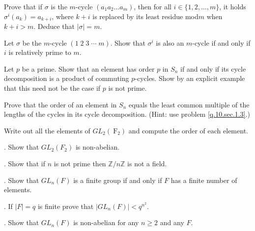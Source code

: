 \documentclass[
    11pt,a4paper,
]{exam}
\begin{document}
\begin{questions}
    \question\label{q.10.sec.1.3}
    Prove that if \(\sigma\) is the \(m\)-cycle \(\left(a_1 a_2 \ldots a_m\right)\), then for all \(i \in\{1,2, \ldots, m\}\), it holds \(\sigma^i\left(a_k\right)=a_{k+i}\), where \(k+i\) is replaced by its least residue mod\;\(m\) when \(k+i>m\). Deduce that \(|\sigma|=m\).
    
    \question
    Let \(\sigma\) be the \(m\)-cycle \((1\; 2\; 3\; \cdots\; m)\). Show that \(\sigma^i\) is also an \(m\)-cycle if and only if \(i\) is relatively prime to \(m\).
    
    
    \question
    Let \(p\) be a prime. Show that an element has order \(p\) in \(S_n\) if and only if its cycle decomposition is a product of commuting \(p\)-cycles. Show by an explicit example that this need not be the case if \(p\) is not prime.
    
    \question
    Prove that the order of an element in \(S_n\) equals the least common multiple of the lengths of the cycles in its cycle decomposition. (Hint: use problem \ref{q.10.sec.1.3}.)
    
    
    \question
    
    
    
    
    \question
    Write out all the elements of \(G L_2\left(\mathrm{~F}_2\right)\) and compute the order of each element.
    
    . Show that \(G L_2\left(F_2\right)\) is non-abelian.
    
    . Show that if \(n\) is not prime then \(\mathbb{Z} / n \mathbb{Z}\) is not a field.
    
    . Show that \(G L_n(F)\) is a finite group if and only if \(F\) has a finite number of elements.
    
    . If \(|F|=q\) is finite prove that \(\left|G L_n(F)\right|<q^{n^2}\).
    
    . Show that \(G L_n(F)\) is non-abelian for any \(n \geq 2\) and any \(F\).
    
    \hfill\null\par
    \hspace*{-1cm}
    

\end{questions}
\end{document}
